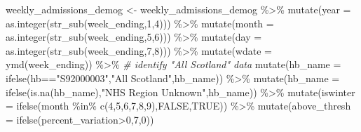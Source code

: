 \documentclass[
]{article}
\newenvironment{Shaded}{\begin{snugshade}}{\end{snugshade}}
\newcommand{\AttributeTok}[1]{\textcolor[rgb]{0.77,0.63,0.00}{#1}}
\newcommand{\CommentTok}[1]{\textcolor[rgb]{0.56,0.35,0.01}{\textit{#1}}}
\newcommand{\ConstantTok}[1]{\textcolor[rgb]{0.00,0.00,0.00}{#1}}
\newcommand{\DecValTok}[1]{\textcolor[rgb]{0.00,0.00,0.81}{#1}}
\newcommand{\FunctionTok}[1]{\textcolor[rgb]{0.00,0.00,0.00}{#1}}
\newcommand{\NormalTok}[1]{#1}
\newcommand{\OtherTok}[1]{\textcolor[rgb]{0.56,0.35,0.01}{#1}}
\newcommand{\SpecialCharTok}[1]{\textcolor[rgb]{0.00,0.00,0.00}{#1}}
\newcommand{\StringTok}[1]{\textcolor[rgb]{0.31,0.60,0.02}{#1}}
\begin{document}
\begin{Shaded}
\begin{Highlighting}[]
\NormalTok{weekly\_admissions\_demog }\OtherTok{\textless{}{-}}\NormalTok{ weekly\_admissions\_demog }\SpecialCharTok{\%\textgreater{}\%} 
  \FunctionTok{mutate}\NormalTok{(}\AttributeTok{year =} \FunctionTok{as.integer}\NormalTok{(}\FunctionTok{str\_sub}\NormalTok{(week\_ending,}\DecValTok{1}\NormalTok{,}\DecValTok{4}\NormalTok{))) }\SpecialCharTok{\%\textgreater{}\%} 
  \FunctionTok{mutate}\NormalTok{(}\AttributeTok{month =} \FunctionTok{as.integer}\NormalTok{(}\FunctionTok{str\_sub}\NormalTok{(week\_ending,}\DecValTok{5}\NormalTok{,}\DecValTok{6}\NormalTok{))) }\SpecialCharTok{\%\textgreater{}\%} 
  \FunctionTok{mutate}\NormalTok{(}\AttributeTok{day =} \FunctionTok{as.integer}\NormalTok{(}\FunctionTok{str\_sub}\NormalTok{(week\_ending,}\DecValTok{7}\NormalTok{,}\DecValTok{8}\NormalTok{))) }\SpecialCharTok{\%\textgreater{}\%} 
  \FunctionTok{mutate}\NormalTok{(}\AttributeTok{wdate =} \FunctionTok{ymd}\NormalTok{(week\_ending)) }\SpecialCharTok{\%\textgreater{}\%} 
  \CommentTok{\# identify "All Scotland" data}
  \FunctionTok{mutate}\NormalTok{(}\AttributeTok{hb\_name =} \FunctionTok{ifelse}\NormalTok{(hb}\SpecialCharTok{==}\StringTok{"S92000003"}\NormalTok{,}\StringTok{"All Scotland"}\NormalTok{,hb\_name)) }\SpecialCharTok{\%\textgreater{}\%} 
  \FunctionTok{mutate}\NormalTok{(}\AttributeTok{hb\_name =} \FunctionTok{ifelse}\NormalTok{(}\FunctionTok{is.na}\NormalTok{(hb\_name),}\StringTok{"NHS Region Unknown"}\NormalTok{,hb\_name)) }\SpecialCharTok{\%\textgreater{}\%} 
  \FunctionTok{mutate}\NormalTok{(}\AttributeTok{iswinter =} \FunctionTok{ifelse}\NormalTok{(month }\SpecialCharTok{\%in\%} \FunctionTok{c}\NormalTok{(}\DecValTok{4}\NormalTok{,}\DecValTok{5}\NormalTok{,}\DecValTok{6}\NormalTok{,}\DecValTok{7}\NormalTok{,}\DecValTok{8}\NormalTok{,}\DecValTok{9}\NormalTok{),}\ConstantTok{FALSE}\NormalTok{,}\ConstantTok{TRUE}\NormalTok{)) }\SpecialCharTok{\%\textgreater{}\%} 
  \FunctionTok{mutate}\NormalTok{(}\AttributeTok{above\_thresh =} \FunctionTok{ifelse}\NormalTok{(percent\_variation}\SpecialCharTok{\textgreater{}}\DecValTok{0}\NormalTok{,}\DecValTok{7}\NormalTok{,}\DecValTok{0}\NormalTok{))}
\end{Highlighting}
\end{Shaded}
\end{document}
